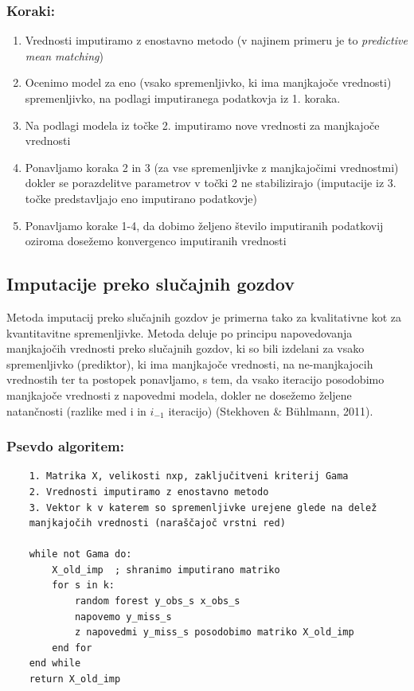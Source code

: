 \documentclass[12pt,a4paper]{article}
\begin{document}
\subsubsection{Koraki:}
\begin{enumerate}
    \item 
    Vrednosti imputiramo z enostavno metodo (v najinem primeru je to \emph{predictive mean matching})
    \item
    Ocenimo model za eno (vsako spremenljivko, ki ima manjkajoče vrednosti) spremenljivko, na podlagi imputiranega podatkovja iz 1. koraka.
    \item
    Na podlagi modela iz točke 2. imputiramo nove vrednosti za manjkajoče vrednosti
    \item
    Ponavljamo koraka 2 in 3 (za vse spremenljivke z manjkajočimi vrednostmi) dokler se porazdelitve parametrov v točki 2 ne stabilizirajo (imputacije iz 3. točke predstavljajo eno imputirano podatkovje)
    \item
    Ponavljamo korake 1-4, da dobimo željeno število imputiranih podatkovij oziroma dosežemo konvergenco imputiranih vrednosti
\end{enumerate}

\subsection{Imputacije preko slučajnih gozdov}
Metoda imputacij preko slučajnih gozdov je primerna tako za kvalitativne kot za kvantitavitne spremenljivke. Metoda deluje po principu napovedovanja manjkajočih vrednosti preko slučajnih gozdov, ki so bili izdelani za vsako spremenljivko (prediktor), ki ima manjkajoče vrednosti, na ne-manjkajocih vrednostih ter ta postopek ponavljamo, s tem, da vsako iteracijo posodobimo manjkajoče vrednosti z napovedmi modela, dokler ne dosežemo željene natančnosti (razlike med i in $i_{-1}$ iteracijo) (Stekhoven \& Bühlmann, 2011).

\subsubsection{Psevdo algoritem:}
\begin{verbatim}
    1. Matrika X, velikosti nxp, zaključitveni kriterij Gama
    2. Vrednosti imputiramo z enostavno metodo
    3. Vektor k v katerem so spremenljivke urejene glede na delež 
    manjkajočih vrednosti (naraščajoč vrstni red)
    
    while not Gama do:
        X_old_imp  ; shranimo imputirano matriko
        for s in k:
            random forest y_obs_s x_obs_s
            napovemo y_miss_s
            z napovedmi y_miss_s posodobimo matriko X_old_imp
        end for
    end while
    return X_old_imp
\end{verbatim}
\end{document}

